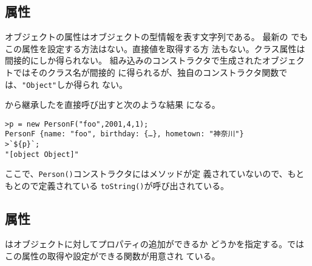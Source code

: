 \subsection{\protect{}属性}
オブジェクトの属性はオブジェクトの型情報を表す文字列である。
最新の \JS でもこの属性を設定する方法はない。直接値を取得する方
法もない。クラス属性は間接的にしか得られない。
組み込みのコンストラクタで生成されたオブジェクトではそのクラス名が間接的
に得られるが、独自のコンストラクタ関数では、\texttt{"Object"}しか得られ
ない。
\begin{Exec}\upshape\label{}
から継承したを直接呼び出すと次のような結果
になる。
\begin{Verbatim}
>p = new PersonF("foo",2001,4,1);
PersonF {name: "foo", birthday: {…}, hometown: "神奈川"}
>`${p}`;
"[object Object]"
\end{Verbatim}
ここで、\texttt{Person()}コンストラクタにはメソッドが定
義されていないので、もともとので定義されている
 \texttt{toString()}が呼び出されている。
\end{Exec}


\iffalse
 \ElmJ{Array()}オブジェクトには
\texttt{toString()}が定義(オーバーライド)されているので次のような形にし
ないとこのような結果が得られない。
\begin{Verbatim}
>Object.prototype.toString.call([]);
"[object Array]"
\end{Verbatim}
これは、\ElmJ{Object}の\ElmJ{prototype}属性に定義されている
\ElmJ{toString}を引数のメソッドとして利用することを意味する。
\ElmJ{prototype}の意味は後で説明をする。
同じように他のオブジェクトで実行すると次のようになる(Operaで実行)。
\begin{Verbatim}
>Object.prototype.toString.call(null);
"[object Null]"
>Object.prototype.toString.call(undefined);
"[object Undefined]"
>Object.prototype.toString.call(NaN);
"[object Number]"
>Object.prototype.toString.call(window);
"[object global]"
>window+""
"[object Window]"
\end{Verbatim}
なお、FireFoxやInternet Explorer では最後の例は次のようになる。
\begin{Verbatim}
>Object.prototype.toString.call(window);
"[object Window]"
>window+""
"[object Window]"
\end{Verbatim}
 \fi
\subsection{\protect{}属性}
はオブジェクトに対してプロパティの追加ができるか
どうかを指定する。\JS ではこの属性の取得や設定ができる関数が用意され
ている。

